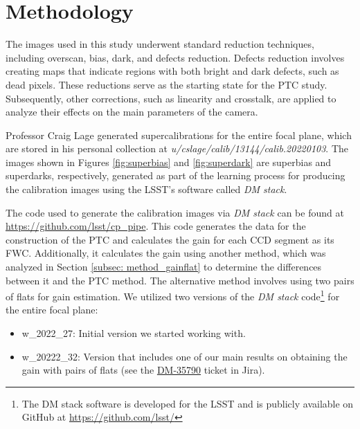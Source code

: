 \section{Methodology} \label{sec:methods}

The images used in this study underwent standard reduction techniques, including overscan, bias, dark, and defects reduction. Defects reduction involves creating maps that indicate regions with both bright and dark defects, such as dead pixels. These reductions serve as the starting state for the PTC study. Subsequently, other corrections, such as linearity and crosstalk, are applied to analyze their effects on the main parameters of the camera.

\vspace{3mm}
Professor Craig Lage generated supercalibrations for the entire focal plane, which are stored in his personal collection at \textit{u/cslage/calib/13144/calib.20220103}. The images shown in Figures \ref{fig:superbias} and \ref{fig:superdark} are superbias and superdarks, respectively, generated as part of the learning process for producing the calibration images using the LSST's software called \textit{DM stack}.

\vspace{3mm}
The code used to generate the calibration images via \textit{DM stack} can be found at \href{https://github.com/lsst/cp_pipe}{https://github.com/lsst/cp\_pipe}. This code generates the data for the construction of the PTC and calculates the gain for each CCD segment as its FWC. Additionally, it calculates the gain using another method, which was analyzed in Section \ref{subsec: method_gainflat} to determine the differences between it and the PTC method. The alternative method involves using two pairs of flats for gain estimation. We utilized two versions of the \textit{DM stack} code\footnote{The DM stack software is developed for the LSST and is publicly available on GitHub at \href{https://github.com/lsst/}{https://github.com/lsst/}} for the entire focal plane:

\begin{itemize}
    \item w_2022_27: Initial version we started working with.
    \item w_20222_32: Version that includes one of our main results on obtaining the gain with pairs of flats (see the \href{https://jira.lsstcorp.org/browse/DM-35790}{DM-35790} ticket in Jira).
\end{itemize}
